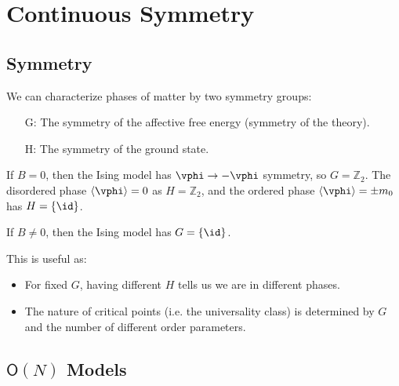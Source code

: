 \documentclass[12pt]{article}
\begin{document}
\newpage

\section{Continuous Symmetry}%
\label{sec:cs}

\subsection{Symmetry}%
\label{sub:sss}

We can characterize phases of matter by two symmetry groups:
\begin{enumerate}
	\item[G:] The symmetry of the affective free energy (symmetry of the theory).
	\item[H:] The symmetry of the ground state.
\end{enumerate}

\begin{exbox}
	If $B = 0$, then the Ising model has $\vphi \to -\vphi$ symmetry, so $G = \mathbb{Z}_2$. The disordered phase $\langle \vphi \rangle = 0$ as $H = \mathbb{Z}_2$, and the ordered phase $\langle \vphi \rangle = \pm m_0$ has $H = \{\id\}$.

	If $B \neq 0$, then the Ising model has $G = \{\id\}$.
\end{exbox}

This is useful as:
\begin{itemize}
	\item For fixed $G$, having different $H$ tells us we are in different phases.
	\item The nature of critical points (i.e. the universality class) is determined by $G$ and the number of different order parameters.
\end{itemize}

\subsection{\texorpdfstring{$\mathsf{O}(N)$}{O(N)} Models}%
\label{sub:on}
\end{document}
